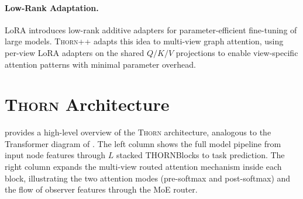 \documentclass[11pt,a4paper]{article}
\newcommand{\thorn}{\textsc{Thorn}}
\newcommand{\thornpp}{\textsc{Thorn++}}
\begin{document}
\paragraph{Low-Rank Adaptation.}
LoRA \citep{hu2020lora} introduces low-rank additive adapters for
parameter-efficient fine-tuning of large models.
\thornpp{} adapts this idea to multi-view graph attention, using
per-view LoRA adapters on the shared $Q/K/V$ projections to enable
view-specific attention patterns with minimal parameter overhead.

\section{\thorn{} Architecture}
\label{sec:arch}

 provides a high-level overview of the \thorn{}
architecture, analogous to the Transformer diagram of
\citet{vaswani2017attention}.
The left column shows the full model pipeline from input node features
through $L$ stacked THORNBlocks to task prediction.
The right column expands the multi-view routed attention mechanism inside
each block, illustrating the two attention modes (pre-softmax and
post-softmax) and the flow of observer features through the MoE router.
\end{document}

